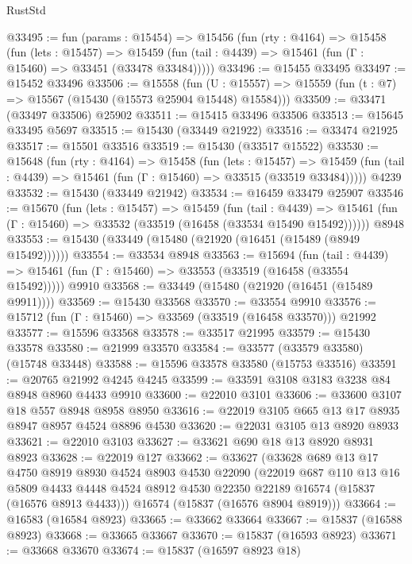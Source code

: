 \begin{lexlean}{RustStd}
\begin{coremodule}
@33495 := fun (params : @15454) =>
  @15456
    (fun (rty : @4164) =>
    @15458
      (fun (lets : @15457) =>
      @15459 (fun (tail : @4439) => @15461 (fun (Γ : @15460) => @33451 (@33478 @33484)))))
@33496 := @15455 @33495
@33497 := @15452 @33496
@33506 := @15558
    (fun (U : @15557) => @15559 (fun (t : @7) => @15567 (@15430 (@15573 @25904 @15448) @15584)))
@33509 := @33471 (@33497 @33506) @25902
@33511 := @15415 @33496 @33506
@33513 := @15645 @33495 @5697
@33515 := @15430 (@33449 @21922)
@33516 := @33474 @21925
@33517 := @15501 @33516
@33519 := @15430 (@33517 @15522)
@33530 := @15648
    (fun (rty : @4164) =>
    @15458
      (fun (lets : @15457) =>
      @15459 (fun (tail : @4439) => @15461 (fun (Γ : @15460) => @33515 (@33519 @33484)))))
    @4239
@33532 := @15430 (@33449 @21942)
@33534 := @16459 @33479 @25907
@33546 := @15670
    (fun (lets : @15457) =>
    @15459
      (fun (tail : @4439) =>
      @15461 (fun (Γ : @15460) => @33532 (@33519 (@16458 (@33534 @15490 @15492))))))
    @8948
@33553 := @15430 (@33449 (@15480 (@21920 (@16451 (@15489 (@8949 @15492))))))
@33554 := @33534 @8948
@33563 := @15694
    (fun (tail : @4439) => @15461 (fun (Γ : @15460) => @33553 (@33519 (@16458 (@33554 @15492)))))
    @9910
@33568 := @33449 (@15480 (@21920 (@16451 (@15489 @9911))))
@33569 := @15430 @33568
@33570 := @33554 @9910
@33576 := @15712 (fun (Γ : @15460) => @33569 (@33519 (@16458 @33570))) @21992
@33577 := @15596 @33568
@33578 := @33517 @21995
@33579 := @15430 @33578
@33580 := @21999 @33570
@33584 := @33577 (@33579 @33580) (@15748 @33448)
@33588 := @15596 @33578 @33580 (@15753 @33516)
@33591 := @20765 @21992 @4245 @4245
@33599 := @33591 @3108 @3183 @3238 @84 @8948 @8960 @4433 @9910
@33600 := @22010 @3101
@33606 := @33600 @3107 @18 @557 @8948 @8958 @8950
@33616 := @22019 @3105 @665 @13 @17 @8935 @8947 @8957 @4524 @8896 @4530
@33620 := @22031 @3105 @13 @8920 @8933
@33621 := @22010 @3103
@33627 := @33621 @690 @18 @13 @8920 @8931 @8923
@33628 := @22019 @127
@33662 := @33627
    (@33628
      @689
      @13
      @17
      @4750
      @8919
      @8930
      @4524
      @8903
      @4530
      @22090
      (@22019
        @687
        @110
        @13
        @16
        @5809
        @4433
        @4448
        @4524
        @8912
        @4530
        @22350
        @22189
        @16574
        (@15837 (@16576 @8913 @4433)))
      @16574
      (@15837 (@16576 @8904 @8919)))
@33664 := @16583 (@16584 @8923)
@33665 := @33662 @33664
@33667 := @15837 (@16588 @8923)
@33668 := @33665 @33667
@33670 := @15837 (@16593 @8923)
@33671 := @33668 @33670
@33674 := @15837 (@16597 @8923 @18)

\end{coremodule}
\end{lexlean}
